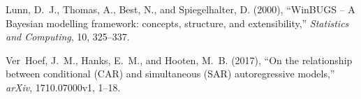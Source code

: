 \documentclass[11pt, titlepage]{article}\usepackage[]{graphicx}\usepackage[]{color}
\begin{document}
\begin{thebibliography}{9}
Lunn, D.~J., Thomas, A., Best, N., and Spiegelhalter, D. (2000),
  \enquote{WinBUGS -- A Bayesian modelling framework: concepts, structure, and
  extensibility,} \textit{Statistics and Computing}, 10, 325--337.

Ver~Hoef, J.~M., Hanks, E.~M., and Hooten, M.~B. (2017), \enquote{On the
  relationship between conditional (CAR) and simultaneous (SAR) autoregressive
  models,} \textit{arXiv}, 1710.07000v1, 1--18.

\end{thebibliography}

\end{document}
